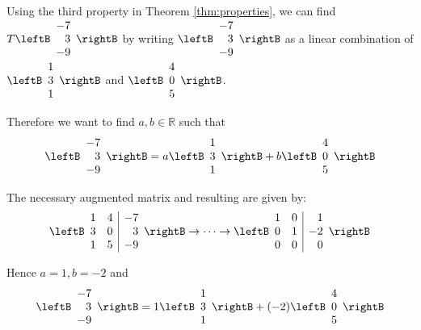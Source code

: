 \begin{solution}
Using the third property in Theorem \ref{thm:properties}, we can find $T \leftB \begin{array}{r}
-7 \\
3 \\
-9
\end{array} \rightB$ by writing $\leftB \begin{array}{r}
-7 \\
3 \\
-9
\end{array} \rightB$ as a linear combination of $\leftB \begin{array}{r}
1 \\
3 \\
1
\end{array} \rightB$ and $\leftB \begin{array}{r}
4 \\
0 \\
5
\end{array} \rightB$. 

Therefore we want to find $a,b \in \mathbb{R}$ such that 
\[
\leftB \begin{array}{r}
-7 \\
3 \\
-9
\end{array} \rightB
=
a
\leftB \begin{array}{r}
1 \\
3 \\
1
\end{array} \rightB
+
b
\leftB \begin{array}{r}
4 \\
0 \\
5
\end{array} \rightB
\]

The necessary augmented matrix and resulting \rref \;are given by:
\[
\leftB
\begin{array}{rr|r}
1 & 4 & -7 \\
3 & 0 & 3 \\
1 & 5 & -9 
\end{array}
\rightB
\rightarrow \cdots \rightarrow
\leftB
\begin{array}{rr|r}
1 & 0 & 1 \\
0 & 1 & -2 \\
0 & 0 & 0 
\end{array}
\rightB
\]

Hence $a = 1, b = -2$ and \[
\leftB \begin{array}{r}
-7 \\
3 \\
-9
\end{array} \rightB
=
1
\leftB \begin{array}{r}
1 \\
3 \\
1
\end{array} \rightB
+
(-2)
\leftB \begin{array}{r}
4 \\
0 \\
5
\end{array} \rightB
\]


\end{solution}
